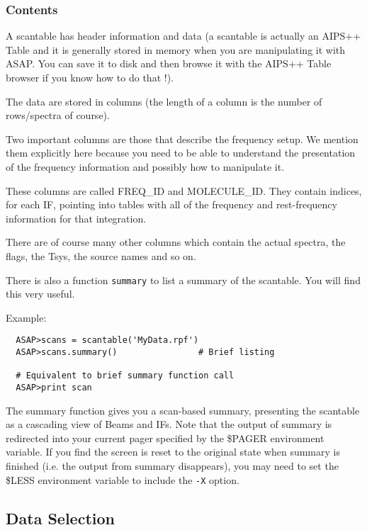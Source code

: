 \documentclass[11pt]{article}
\newcommand{\cmd}[1]{{\tt #1}}
\begin{document}
\subsubsection {Contents}

A scantable has header information and data
(a scantable is actually an AIPS++ Table and it is generally stored in
memory when you are manipulating it with ASAP.  You can save it to
disk and then browse it with the AIPS++ Table browser if you know how
to do that !).

The data are stored in columns (the length of a column is the number of
rows/spectra of course).

Two important columns are those that describe the frequency setup.  We mention
them explicitly here because you need to be able to understand the presentation
of the frequency information and possibly how to manipulate it.

These columns are called FREQ\_ID and MOLECULE\_ID.  They contain indices, for
each IF, pointing into tables with all of the frequency and rest-frequency
information for that integration. 

There are of course many other columns which contain the actual spectra,
the flags, the Tsys, the source names and so on.

There is also a function \cmd{summary} to list a summary of the scantable.
You will find this very useful.

Example:

\begin{verbatim}
  ASAP>scans = scantable('MyData.rpf')
  ASAP>scans.summary()                # Brief listing

  # Equivalent to brief summary function call
  ASAP>print scan
\end{verbatim}

The summary function gives you a scan-based summary, presenting the
scantable as a cascading view of Beams and IFs. Note that the output
of summary is redirected into your current pager specified by the
\$PAGER environment variable. If you find the screen is reset to the
original state when summary is finished (i.e. the output from summary
disappears), you may need to set the \$LESS environment variable to
include the \cmd{-X} option.

\subsection{Data Selection}
\label{sec:selection}
\end{document}
